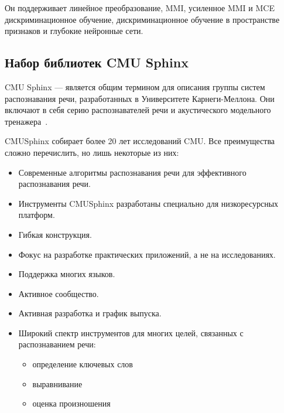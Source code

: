 Он поддерживает линейное преобразование, MMI,
усиленное MMI и MCE дискриминационное обучение, дискриминационное обучение в
пространстве признаков и глубокие нейронные сети.

\subsection{Набор библиотек CMU Sphinx}
CMU Sphinx --- является общим термином для описания группы систем распознавания
речи, разработанных в Университете Карнеги-Меллона. Они включают в себя серию
распознавателей речи и акустического модельного тренажера~\cite{sphinx}.

CMUSphinx собирает более 20 лет исследований CMU. Все преимущества сложно перечислить,
но лишь некоторые из них:
\begin{itemize}
    \item Современные алгоритмы распознавания речи для эффективного распознавания речи.
    \item Инструменты CMUSphinx разработаны специально для низкоресурсных платформ.
    \item Гибкая конструкция.
    \item Фокус на разработке практических приложений, а не на исследованиях.
    \item Поддержка многих языков.
    \item Активное сообщество.
    \item Активная разработка и график выпуска.
    \item Широкий спектр инструментов для многих целей, связанных с распознаванием речи:
    \begin{itemize}
        \item определение ключевых слов
        \item выравнивание
        \item оценка произношения
    \end{itemize}
\end{itemize}
